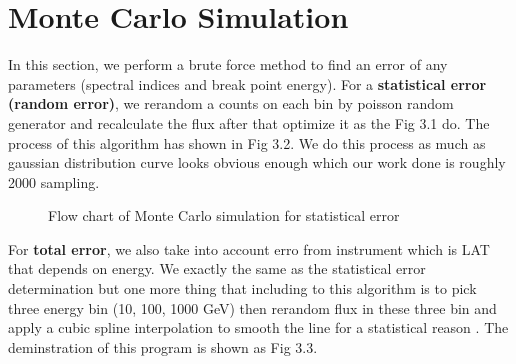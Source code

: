 \section{Monte Carlo Simulation}
In this section, we perform a brute force method to find an error of any parameters (spectral indices and break point energy). For a \textbf{statistical error (random error)}, we rerandom a counts on each bin by poisson random generator and recalculate the flux after that optimize it as the Fig 3.1 do. The process of this algorithm has shown in Fig 3.2. We do this process as much as gaussian distribution curve looks obvious enough which our work done is roughly 2000 sampling.

\begin{figure}[h]
    \centering
    \caption{Flow chart of Monte Carlo simulation for statistical error}
\end{figure}

\par For \textbf{total error}, we also take into account erro from instrument which is LAT that depends on energy. We exactly the same as the statistical error determination but one more thing that including to this algorithm is to pick three energy bin (10, 100, 1000 GeV) then rerandom flux in these three bin and apply a cubic spline interpolation to smooth the line for a statistical reason \cite{FermiDetail}. The deminstration of this program is shown as Fig 3.3.


